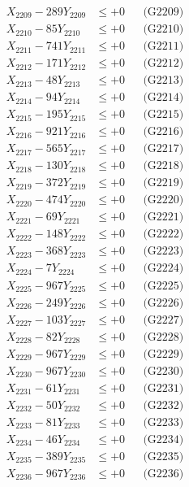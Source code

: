 \documentclass[a4paper,10pt]{article}
\begin{document}
{\begin{align}
X_{2209} - 289Y_{2209} &\leq +0 && \text{(G2209)} \\
X_{2210} - 85Y_{2210} &\leq +0 && \text{(G2210)} \\
\allowbreak
X_{2211} - 741Y_{2211} &\leq +0 && \text{(G2211)} \\
X_{2212} - 171Y_{2212} &\leq +0 && \text{(G2212)} \\
X_{2213} - 48Y_{2213} &\leq +0 && \text{(G2213)} \\
X_{2214} - 94Y_{2214} &\leq +0 && \text{(G2214)} \\
X_{2215} - 195Y_{2215} &\leq +0 && \text{(G2215)} \\
X_{2216} - 921Y_{2216} &\leq +0 && \text{(G2216)} \\
X_{2217} - 565Y_{2217} &\leq +0 && \text{(G2217)} \\
X_{2218} - 130Y_{2218} &\leq +0 && \text{(G2218)} \\
X_{2219} - 372Y_{2219} &\leq +0 && \text{(G2219)} \\
X_{2220} - 474Y_{2220} &\leq +0 && \text{(G2220)} \\
\allowbreak
X_{2221} - 69Y_{2221} &\leq +0 && \text{(G2221)} \\
X_{2222} - 148Y_{2222} &\leq +0 && \text{(G2222)} \\
X_{2223} - 368Y_{2223} &\leq +0 && \text{(G2223)} \\
X_{2224} - 7Y_{2224} &\leq +0 && \text{(G2224)} \\
X_{2225} - 967Y_{2225} &\leq +0 && \text{(G2225)} \\
X_{2226} - 249Y_{2226} &\leq +0 && \text{(G2226)} \\
X_{2227} - 103Y_{2227} &\leq +0 && \text{(G2227)} \\
X_{2228} - 82Y_{2228} &\leq +0 && \text{(G2228)} \\
X_{2229} - 967Y_{2229} &\leq +0 && \text{(G2229)} \\
X_{2230} - 967Y_{2230} &\leq +0 && \text{(G2230)} \\
\allowbreak
X_{2231} - 61Y_{2231} &\leq +0 && \text{(G2231)} \\
X_{2232} - 50Y_{2232} &\leq +0 && \text{(G2232)} \\
X_{2233} - 81Y_{2233} &\leq +0 && \text{(G2233)} \\
X_{2234} - 46Y_{2234} &\leq +0 && \text{(G2234)} \\
X_{2235} - 389Y_{2235} &\leq +0 && \text{(G2235)} \\
X_{2236} - 967Y_{2236} &\leq +0 && \text{(G2236)} \\

\end{align}}
\end{document}

